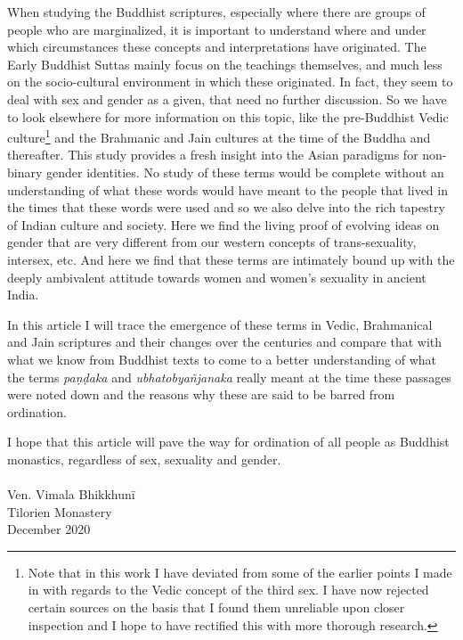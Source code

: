 When studying the Buddhist scriptures, especially where there are groups of people who are marginalized, it is important to understand where and under which circumstances these concepts and interpretations have originated. The Early Buddhist Suttas mainly focus on the teachings themselves, and much less on the socio-cultural environment in which these originated. In fact, they seem to deal with sex and gender as a given, that need no further discussion. So we have to look elsewhere for more information on this topic, like the pre-Buddhist Vedic culture\footnote{Note that in this work I have deviated from some of the earlier points I made in \cite{vimala} with regards to the Vedic concept of the third sex. I have now rejected certain sources on the basis that I found them unreliable upon closer inspection and I hope to have rectified this with more thorough research.} and the Brahmanic and Jain cultures at the time of the Buddha and thereafter. This study provides a fresh insight into the Asian paradigms for non-binary gender identities. No study of these terms would be complete without an understanding of what these words would have meant to the people that lived in the times that these words were used and so we also delve into the rich tapestry of Indian culture and society. Here we find the living proof of evolving ideas on gender that are very different from our western concepts of trans-sexuality, intersex, etc. And here we find that these terms are intimately bound up with the deeply ambivalent attitude towards women and women's sexuality in ancient India.

In this article I will trace the emergence of these terms in Vedic, Brahmanical and Jain scriptures and their changes over the centuries and compare that with what we know from Buddhist texts to come to a better understanding of what the terms {\em paṇḍaka} and {\em ubhatob­yañ­janaka} really meant at the time these passages were noted down and the reasons why these are said to be barred from ordination.

I hope that this article will pave the way for ordination of all people as Buddhist monastics, regardless of sex, sexuality and gender.\\\\

Ven. Vimala Bhikkhunī\\
Tilorien Monastery\\
December 2020\\


